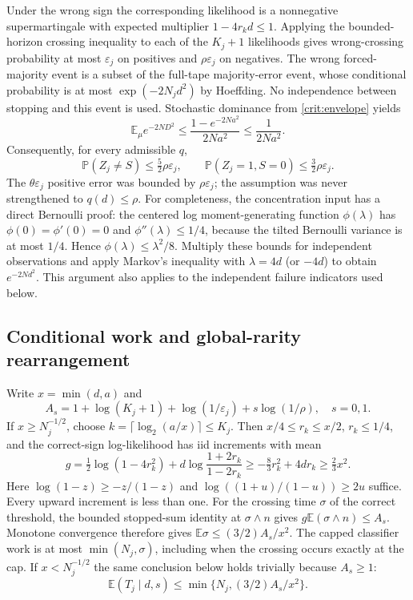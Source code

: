 Under the wrong sign the corresponding likelihood is a nonnegative
supermartingale with expected multiplier $1-4r_kd\le1$. Applying the
bounded-horizon crossing inequality to each of the $K_j+1$ likelihoods gives
wrong-crossing probability at most $\varepsilon_j$ on positives and
$\rho\varepsilon_j$ on negatives. The wrong forced-majority event is a
subset of the full-tape majority-error event, whose conditional probability
is at most $\exp(-2N_jd^2)$ by Hoeffding. No independence between stopping
and this event is used. Stochastic dominance from \eqref{crit:envelope} yields
\[
 \mathbb E_\mu e^{-2ND^2}
 \le\frac{1-e^{-2Na^2}}{2Na^2}\le\frac1{2Na^2}.
\]
Consequently, for every admissible $q$,
\begin{equation}\label{crit:error}
 \mathbb P(Z_j\ne S)\le\tfrac52\rho\varepsilon_j,
 \qquad
 \mathbb P(Z_j=1,S=0)\le\tfrac32\rho\varepsilon_j.
\end{equation}
The $\theta\varepsilon_j$ positive error was bounded by
$\rho\varepsilon_j$; the assumption was never strengthened to $q(d)\le\rho$.
For completeness, the concentration input has a direct Bernoulli proof:
the centered log moment-generating function $\phi(\lambda)$ has
$\phi(0)=\phi'(0)=0$ and $\phi''(\lambda)\le1/4$, because the tilted
Bernoulli variance is at most $1/4$. Hence $\phi(\lambda)\le\lambda^2/8$.
Multiply these bounds for independent observations and apply Markov's
inequality with $\lambda=4d$ (or $-4d$) to obtain $e^{-2Nd^2}$.
This argument also applies to the independent failure indicators used below.

\subsection{Conditional work and global-rarity rearrangement}
Write $x=\min(d,a)$ and
\[
 A_s=1+\log(K_j+1)+\log(1/\varepsilon_j)+s\log(1/\rho),\quad s=0,1.
\]
If $x\ge N_j^{-1/2}$, choose $k=\lceil\log_2(a/x)\rceil\le K_j$.
Then $x/4\le r_k\le x/2$, $r_k\le1/4$, and the correct-sign log-likelihood
has iid increments with mean
\[
 g=\tfrac12\log(1-4r_k^2)
       +d\log\frac{1+2r_k}{1-2r_k}
 \ge-\tfrac83r_k^2+4dr_k\ge\tfrac23x^2.
\]
Here $\log(1-z)\ge-z/(1-z)$ and
$\log((1+u)/(1-u))\ge2u$ suffice. Every upward increment is less than one.
For the crossing time $\sigma$ of the correct threshold, the bounded
stopped-sum identity at $\sigma\wedge n$ gives
$g\mathbb E(\sigma\wedge n)\le A_s$. Monotone convergence therefore gives
$\mathbb E\sigma\le(3/2)A_s/x^2$. The capped classifier work is at most
$\min(N_j,\sigma)$, including when the crossing occurs exactly at the cap.
If $x<N_j^{-1/2}$ the same conclusion below holds trivially because $A_s\ge1$:
\begin{equation}\label{crit:condwork}
 \mathbb E(T_j\mid d,s)\le\min\{N_j,(3/2)A_s/x^2\}.
\end{equation}

